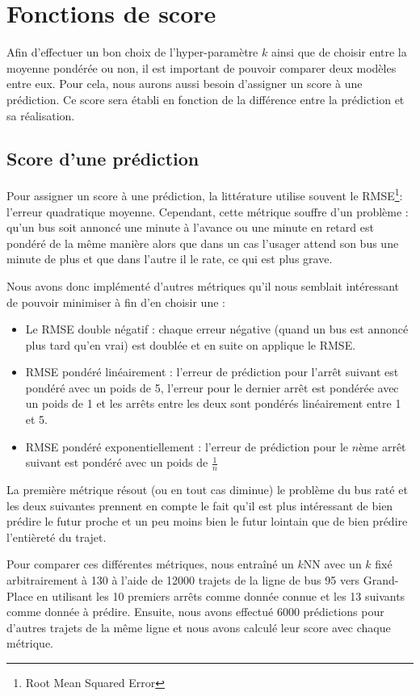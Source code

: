 \documentclass[letterpaper]{article}
\begin{document}
\section{Fonctions de score}

Afin d'effectuer un bon choix de l'hyper-paramètre $k$ ainsi que de choisir entre la moyenne pondérée ou non, il est important de pouvoir comparer deux modèles entre eux. Pour cela, nous aurons aussi besoin d'assigner un score à une prédiction. Ce score sera établi en fonction de la différence entre la prédiction et sa réalisation.

\subsection{Score d'une prédiction}
Pour assigner un score à une prédiction, la littérature utilise souvent le RMSE\footnote{Root Mean Squared Error}: l'erreur quadratique moyenne.
Cependant, cette métrique souffre d'un problème :
qu'un bus soit annoncé une minute à l'avance ou une minute en retard est pondéré de la même manière alors que dans un cas l'usager attend son bus une minute de plus et que dans l'autre il le rate, ce qui est plus grave.

Nous avons donc implémenté d'autres métriques qu'il nous semblait intéressant de pouvoir minimiser à fin d'en choisir une :
\begin{itemize}
    \item Le RMSE double négatif : chaque erreur négative (quand un bus est annoncé plus tard qu'en vrai) est doublée et en suite on applique le RMSE.
    \item RMSE pondéré linéairement : l'erreur de prédiction pour l'arrêt suivant est pondéré avec un poids de 5, l'erreur pour le dernier arrêt est pondérée avec un poids de 1 et les arrêts entre les deux sont pondérés linéairement entre 1 et 5.
    \item RMSE pondéré exponentiellement : l'erreur de prédiction pour le $n$ème arrêt suivant est pondéré avec un poids de $\frac{1}{n}$
\end{itemize}
\vspace{1em}

La première métrique résout (ou en tout cas diminue) le problème du bus raté et les deux suivantes prennent en compte le fait qu'il est plus intéressant de bien prédire le futur proche et un peu moins bien le futur lointain que de bien prédire l'entièreté du trajet.

Pour comparer ces différentes métriques, nous entraîné un $k$NN avec un $k$ fixé arbitrairement à 130 à l'aide de 12000 trajets de la ligne de bus 95 vers Grand-Place en utilisant les 10 premiers arrêts comme donnée connue et les 13 suivants comme donnée à prédire. Ensuite, nous avons effectué 6000 prédictions pour d'autres trajets de la même ligne et nous avons calculé leur score avec chaque métrique.
\end{document}
